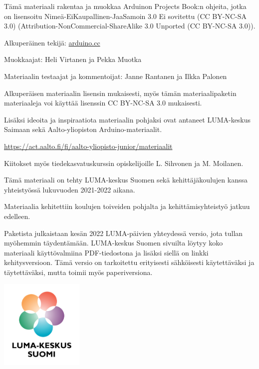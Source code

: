 \documentclass[finnish,oneside]{book}
\begin{document}
\pagestyle{plain}
\begin{tcolorbox}[title = Käyttölisenssi]
Tämä materiaali rakentaa ja muokkaa Arduinon Projects Book:n ohjeita, jotka on lisensoitu Nimeä-EiKaupallinen-JaaSamoin 3.0 Ei sovitettu (CC BY-NC-SA 3.0) (Attribution-NonCommercial-ShareAlike 3.0 Unported (CC BY-NC-SA 3.0)). 


Alkuperäinen tekijä: \url{arduino.cc} 

Muokkaajat: Heli Virtanen ja Pekka Muotka

Materiaalin testaajat ja kommentoijat: Janne Rantanen ja Ilkka Palonen

Alkuperäisen materiaalin lisensin mukaisesti, myös tämän materiaalipaketin materiaaleja voi käyttää lisenssin CC BY-NC-SA 3.0 mukaisesti. 

\doclicenseThis

\tcblower
Lisäksi ideoita ja inspiraatiota materiaalin pohjaksi ovat antaneet LUMA-keskus Saimaan sekä Aalto-yliopiston Arduino-materiaalit. 

\url{https://act.aalto.fi/fi/aalto-yliopisto-junior/materiaalit}

Kiitokset myös tiedekasvatuskurssin opiskelijoille L. Sihvonen ja M. Moilanen. 


\end{tcolorbox}

\begin{tcolorbox}[title=Taustaa]
Tämä materiaali on tehty LUMA-keskus Suomen sekä kehittäjäkoulujen kanssa yhteistyössä lukuvuoden 2021-2022 aikana. 

Materiaalia kehitettiin koulujen toiveiden pohjalta ja kehittämisyhteistyö jatkuu edelleen. 

\tcblower
Paketista julkaistaan kesän 2022 LUMA-päivien yhteydessä versio, jota tullan myöhemmin täydentämään. LUMA-keskus Suomen sivuilta löytyy koko materiaali käyttövalmiina PDF-tiedostona ja lisäksi siellä on linkki kehitysversioon. Tämä versio on tarkoitettu erityisesti sähköisesti käytettäväksi ja täytettäväksi, mutta toimii myös paperiversiona.
\end{tcolorbox}

\begin{center}
\includegraphics[width=0.3\textwidth]{kuvat/luma_flower-multicolored_text-black-vertical-fi.png}
\end{center}
\end{document}
